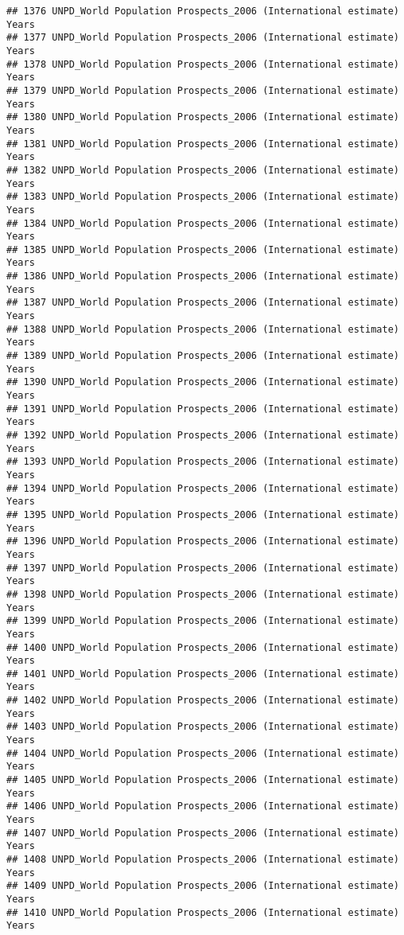 \documentclass[]{article}
\begin{document}
\begin{verbatim}
## 1376 UNPD_World Population Prospects_2006 (International estimate) Years
## 1377 UNPD_World Population Prospects_2006 (International estimate) Years
## 1378 UNPD_World Population Prospects_2006 (International estimate) Years
## 1379 UNPD_World Population Prospects_2006 (International estimate) Years
## 1380 UNPD_World Population Prospects_2006 (International estimate) Years
## 1381 UNPD_World Population Prospects_2006 (International estimate) Years
## 1382 UNPD_World Population Prospects_2006 (International estimate) Years
## 1383 UNPD_World Population Prospects_2006 (International estimate) Years
## 1384 UNPD_World Population Prospects_2006 (International estimate) Years
## 1385 UNPD_World Population Prospects_2006 (International estimate) Years
## 1386 UNPD_World Population Prospects_2006 (International estimate) Years
## 1387 UNPD_World Population Prospects_2006 (International estimate) Years
## 1388 UNPD_World Population Prospects_2006 (International estimate) Years
## 1389 UNPD_World Population Prospects_2006 (International estimate) Years
## 1390 UNPD_World Population Prospects_2006 (International estimate) Years
## 1391 UNPD_World Population Prospects_2006 (International estimate) Years
## 1392 UNPD_World Population Prospects_2006 (International estimate) Years
## 1393 UNPD_World Population Prospects_2006 (International estimate) Years
## 1394 UNPD_World Population Prospects_2006 (International estimate) Years
## 1395 UNPD_World Population Prospects_2006 (International estimate) Years
## 1396 UNPD_World Population Prospects_2006 (International estimate) Years
## 1397 UNPD_World Population Prospects_2006 (International estimate) Years
## 1398 UNPD_World Population Prospects_2006 (International estimate) Years
## 1399 UNPD_World Population Prospects_2006 (International estimate) Years
## 1400 UNPD_World Population Prospects_2006 (International estimate) Years
## 1401 UNPD_World Population Prospects_2006 (International estimate) Years
## 1402 UNPD_World Population Prospects_2006 (International estimate) Years
## 1403 UNPD_World Population Prospects_2006 (International estimate) Years
## 1404 UNPD_World Population Prospects_2006 (International estimate) Years
## 1405 UNPD_World Population Prospects_2006 (International estimate) Years
## 1406 UNPD_World Population Prospects_2006 (International estimate) Years
## 1407 UNPD_World Population Prospects_2006 (International estimate) Years
## 1408 UNPD_World Population Prospects_2006 (International estimate) Years
## 1409 UNPD_World Population Prospects_2006 (International estimate) Years
## 1410 UNPD_World Population Prospects_2006 (International estimate) Years

\end{verbatim}
\end{document}
